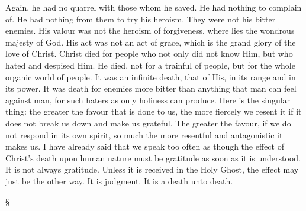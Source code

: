 \documentclass[12pt,letterpaper,oneside]{book}
\begin{document}
Again, he had no quarrel with those whom he 
saved. He had nothing to complain of. He had 
nothing from them to try his heroism. They 
were not his bitter enemies. His valour was 
not the heroism of forgiveness, where lies the 
wondrous majesty of God. His act was not 
an act of grace, which is the grand glory of 
the love of Christ. Christ died for people who 
not only did not know Him, but who hated and 
despised Him. He died, not for a trainful of 
people, but for the whole organic world of
people. It was an infinite death, that of His, 
in its range and in its power. It was death 
for enemies more bitter than anything that 
man can feel against man, for such haters as 
only holiness can produce. Here is the singular 
thing: the greater the favour that is done to 
us, the more fiercely we resent it if it does not 
break us down and make us grateful. The 
greater the favour, if we do not respond in its 
own spirit, so much the more resentful and 
antagonistic it makes us. I have already said 
that we speak too often as though the effect 
of Christ's death upon human nature must be 
gratitude as soon as it is understood. It is 
not always gratitude. Unless it is received in 
the Holy Ghost, the effect may just be the 
other way. It is judgment. It is a death unto 
death. 

\begin{center} \S \end{center}
\end{document}
